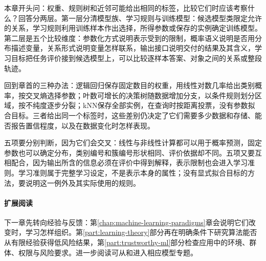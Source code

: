 本章开头问：权重、规则树和近邻可能给出相同的标签，比较它们时应该考察什么？回答分两层。第一层分清模型族、学习规则与训练模型：候选模型类限定允许的关系，学习规则利用训练样本作出选择，所得参数或保存的实例确定训练模型。第二层是五个比较维度：参数化方式说明表示受到的限制，概率语义说明是否用分布描述变量，关系形式说明变量怎样联系，输出接口说明交付的结果及其含义，学习目标把任务评价接到候选模型上，可以比较逐样本答案、对象之间的关系或整段轨迹。

回到章首的三种办法：逻辑回归保存固定数目的权重，用线性对数几率给出类别概率，按交叉熵选择参数；叶数可增长的决策树随数据增加分支，以条件规则划分区域，按不纯度逐步分裂；kNN保存全部实例，在查询时按距离投票，没有参数拟合目标。三者给出同一个标签时，这些差别仍决定了它们需要多少数据和存储、能否报告置信程度，以及在数据变化时怎样表现。

五项要分别判断，因为它们会交叉：线性与非线性计算都可以用于概率预测，固定参数也可以确定分布，类别编号和簇编号形状相同、评价依据却不同。五项又要互相配合，因为输出所含的信息必须在评价中得到解释，表示限制也会进入学习准则。学习准则属于完整学习设定，不是表示本身的属性；没有显式拟合目标的方法，要说明这一例外及其实际使用的规则。

\paragraph{扩展阅读}

下一章先转向经验与反馈：第\ref{chap:machine-learning-paradigms}章会说明它们改变时，学习怎样组织。第\ref{part:learning-theory}部分再在明确条件下研究算法能否从有限经验获得低风险结果，第\ref{part:trustworthy-ml}部分检查应用中的环境、群体、权限与风险要求。进一步阅读可从和进入相应模型专题。
